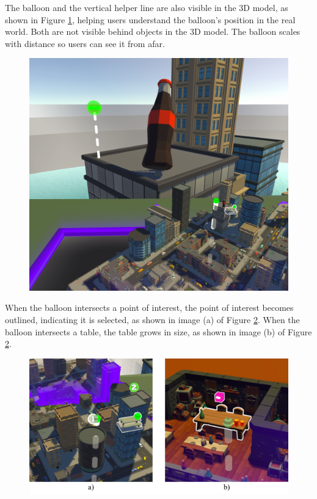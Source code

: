         The balloon and the vertical helper line are also visible in the 3D model, as shown in Figure \ref{fig:balloon_world}, helping users understand the balloon's position in the real world. Both are not visible behind objects in the 3D model. The balloon scales with distance so users can see it from afar.

       \begin{figure}[h!]
            \centering
            \includegraphics[width=1\textwidth]{figures/balloon_world.png}
            \label{fig:balloon_world}
        \end{figure}
        
        When the balloon intersects a point of interest, the point of interest becomes outlined, indicating it is selected, as shown in image (a) of Figure \ref{fig:balloon_selection_intersection}. When the balloon intersects a table, the table grows in size, as shown in image (b) of Figure \ref{fig:balloon_selection_intersection}.

       \begin{figure}[h!]
            \centering
            \includegraphics[width=1\textwidth]{figures/balloon_selection_intersection.png}
            \label{fig:balloon_selection_intersection}
        \end{figure}
    
